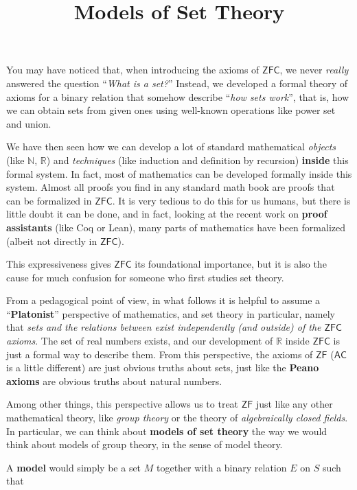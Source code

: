 \documentclass{article}
\title{Models of Set Theory}
\date{\displaydate{articleDate}}
\author{}
\newcommand{\ZF}{\mathsf{ZF}}
\newcommand{\ZFC}{\mathsf{ZFC}}
\newcommand{\Nat}{\mathbb{N}}
\newcommand{\Real}{\mathbb{R}}
\newcommand{\AC}{\mathsf{AC}}
\begin{document}
\maketitle

You may have noticed that, when introducing the axioms of $\ZFC$, we never \textit{really} answered the question ``\textit{What is a set?}'' Instead, we developed a formal theory of axioms for a binary relation that somehow describe ``\textit{how sets work}'', that is, how we can obtain sets from given ones using well-known operations like power set and union.

We have then seen how we can develop a lot of standard mathematical \textit{objects} (like $\Nat$, $\Real$) and \textit{techniques} (like induction and definition by recursion) \textbf{inside} this formal system. In fact, most of mathematics can be developed formally inside this system. Almost all proofs you find in any standard math book are proofs that can be formalized in $\ZFC$. It is very tedious to do this for us humans, but there is little doubt it can be done, and in fact, looking at the recent work on \textbf{proof assistants} (like Coq or Lean), many parts of mathematics have been formalized (albeit not directly in $\ZFC$).

This expressiveness gives $\ZFC$ its foundational importance, but it is also the cause for much confusion for someone who first studies set theory.

From a pedagogical point of view, in what follows it is helpful to assume a ``\textbf{Platonist}'' perspective of mathematics, and set theory in particular, namely that \textit{sets and the relations between exist independently (and outside) of the $\ZFC$ axioms}. The set of real numbers exists, and our development of $\Real$ inside $\ZFC$ is just a formal way to describe them. From this perspective, the axioms of $\ZF$ ($\AC$ is a little different) are just obvious truths about sets, just like the \textbf{Peano axioms} are obvious truths about natural numbers.

Among other things, this perspective allows us to treat $\ZF$ just like any other mathematical theory, like \textit{group theory} or the theory of \textit{algebraically closed fields}.
In particular, we can think about \textbf{models of set theory} the way we would think about models of group theory, in the sense of model theory.

A \textbf{model} would simply be a set $M$ together with a binary relation $E$ on $S$ such that
\end{document}

